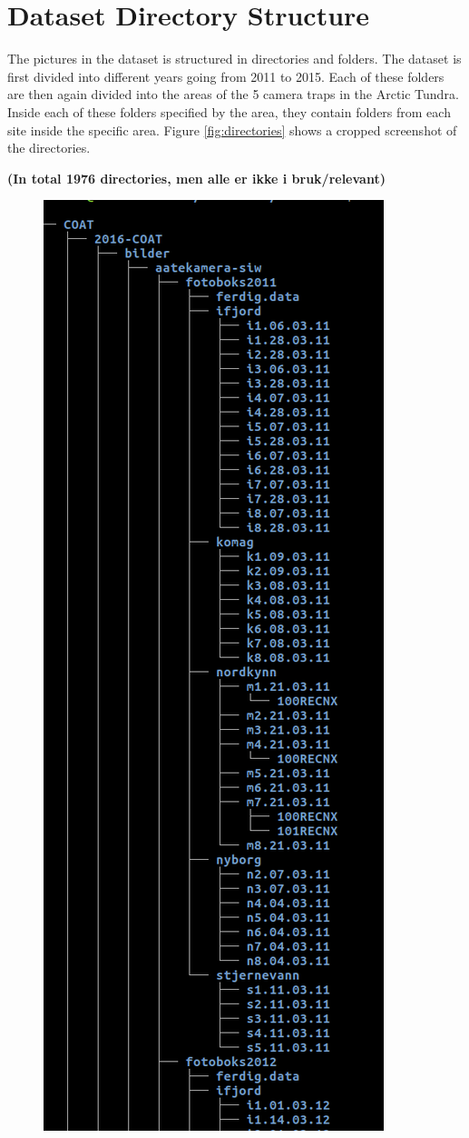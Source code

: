 \documentclass[USenglish]{uit-thesis}
\begin{document}
\section{Dataset Directory Structure}
The pictures in the dataset is structured in directories and folders. The dataset is first divided into different years going from 2011 to 2015. Each of these folders are then again divided into the areas of the 5 camera traps in the Arctic Tundra. Inside each of these folders specified by the area, they contain folders from each site inside the specific area.
Figure \ref{fig:directories} shows a cropped screenshot of the directories.

\textbf{(In total 1976 directories, men alle er ikke i bruk/relevant)}

\begin{figure}
\centering
\includegraphics[scale=0.5]{directory.png}

\end{figure}
\end{document}
